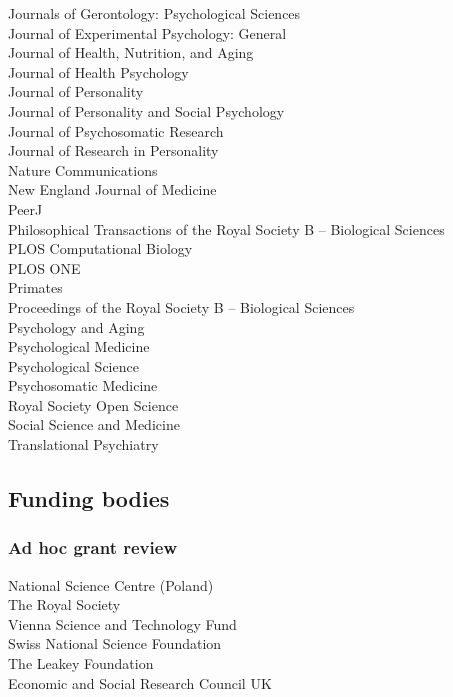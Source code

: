\documentclass[11pt]{article}
\begin{document}
\begin{minipage}[t]{0.49\linewidth}
Journals of Gerontology: Psychological Sciences \\
Journal of Experimental Psychology: General \\
Journal of Health, Nutrition, and Aging \\
Journal of Health Psychology \\
Journal of Personality \\
Journal of Personality and Social Psychology \\
Journal of Psychosomatic Research \\
Journal of Research in Personality \\
Nature Communications \\
New England Journal of Medicine \\
PeerJ \\
Philosophical Transactions of the Royal Society B -- Biological Sciences \\
PLOS Computational Biology \\
PLOS ONE \\
Primates \\
Proceedings of the Royal Society B -- Biological Sciences \\
Psychology and Aging \\
Psychological Medicine \\
Psychological Science \\
Psychosomatic Medicine \\
Royal Society Open Science \\
Social Science and Medicine \\
Translational Psychiatry
\end{minipage}

\subsection*{Funding bodies}

\subsubsection*{Ad hoc grant review}
National Science Centre (Poland) \\
The Royal Society \\
Vienna Science and Technology Fund \\
Swiss National Science Foundation \\
The Leakey Foundation \\
Economic and Social Research Council UK
\end{document}
